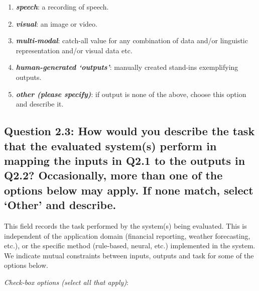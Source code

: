 \documentclass[11pt,a4paper]{article}
\makeatletter
\newcommand{\egcvalue}[1]{\textbf{\textit{#1}}}
\newcommand\footnoteref[1]{\protected@xdef\@thefnmark{\ref{#1}}\@footnotemark}
\makeatother
\begin{document}
\begin{enumerate}[itemsep=0cm,leftmargin=0.5cm,label={\small $\square$}]
            \item \egcvalue{speech}: a recording of speech.
            
            \item \egcvalue{visual}: an image or video.
            
            \item \egcvalue{multi-modal}: catch-all value for any combination of data and/or linguistic representation and/or visual data etc.
            
            \item \egcvalue{human-generated `outputs'}: manually created stand-ins exemplifying outputs.\footnoteref{human-generation}
            
            \item \egcvalue{other (please specify)}: if output is none of the above, choose this option and describe it. 
            
        \end{enumerate}


\vspace{-.3cm}
\subsection*{Question 2.3: How would you describe the task that the evaluated system(s) perform in mapping the inputs in Q2.1 to the outputs in Q2.2? Occasionally, more than one of the options below may apply. If none match, select `Other' and describe.}\label{sec:task}
\vspace{-.1cm}

This field records the task performed by the system(s) being evaluated. This is independent of the application domain (financial reporting, weather forecasting, etc.), or the specific method (rule-based, neural, etc.) implemented in the system. We indicate mutual constraints between inputs, outputs and task for some of the options below. 
    

\vspace{.3cm}
\noindent\textit{Check-box options (select all that apply)}:  
\vspace{-.1cm}
\end{document}
